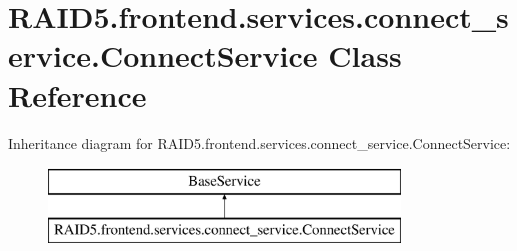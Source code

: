 \hypertarget{class_r_a_i_d5_1_1frontend_1_1services_1_1connect__service_1_1_connect_service}{}\section{R\+A\+I\+D5.\+frontend.\+services.\+connect\+\_\+service.\+Connect\+Service Class Reference}
\label{class_r_a_i_d5_1_1frontend_1_1services_1_1connect__service_1_1_connect_service}
Inheritance diagram for R\+A\+I\+D5.\+frontend.\+services.\+connect\+\_\+service.\+Connect\+Service\+:\begin{figure}[H]
\begin{center}
\leavevmode
\includegraphics[height=2.000000cm]{class_r_a_i_d5_1_1frontend_1_1services_1_1connect__service_1_1_connect_service}
\end{center}
\end{figure}
